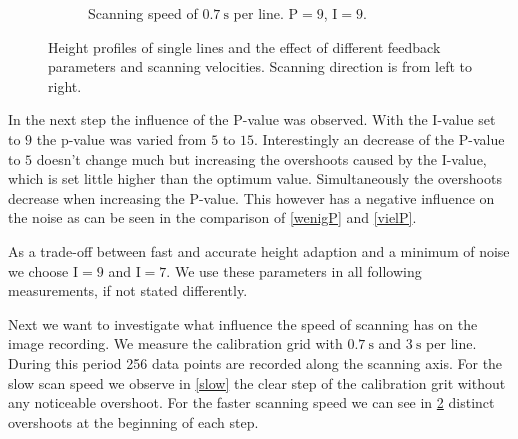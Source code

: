 \documentclass[paper=a4,fontsize=10pt,DIV=18,twocolumn,parskip=half]{scrartcl}
\numberwithin{equation}{section}    %
\begin{document}
\begin{figure}
\begin{subfigure}{0.45\columnwidth}
        \caption{Scanning speed of 
        $\SI{0.7}{\second}$ per line. $\mathrm{P}=9$, $\mathrm{I}=9$.}
        \label{fast}
    \end{subfigure}
    \caption{Height profiles of single lines and the effect of different 
    feedback parameters and scanning velocities. Scanning direction is from left 
    to right.}
\end{figure}

In the next step the influence of the P-value was observed. With the I-value set 
to $9$ the p-value was varied from $5$ to $15$. Interestingly an decrease of the 
P-value to $5$ doesn't change much but increasing the overshoots caused by the 
I-value, which is set little higher than the optimum value. Simultaneously the 
overshoots decrease when increasing the P-value. This however has a negative 
influence on the noise as can be seen in the comparison of \ref{wenigP} and 
\ref{vielP}.



As a trade-off between fast and accurate height adaption and a minimum of noise 
we choose $\mathrm{I}=9$ and $\mathrm{I}=7$. We use these parameters in all 
following measurements, if not stated differently.

Next we want to investigate what influence the speed of scanning has on the 
image recording. We measure the calibration grid with $\SI{0.7}{\second}$ and 
$\SI{3}{\second}$ per line. During this period 256 data points are recorded 
along the scanning axis.  For the slow scan speed we observe in \ref{slow} the 
clear step of the calibration grit without any noticeable overshoot. For the 
faster scanning speed we can see in \ref{fast} distinct overshoots at the 
beginning of each step.
\end{document}
